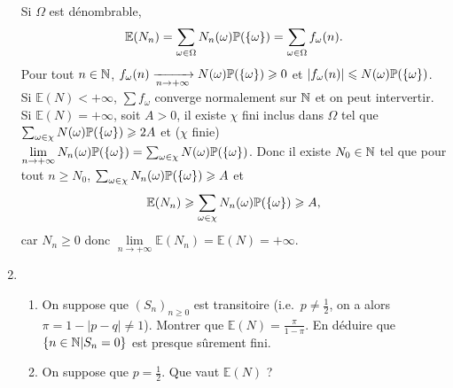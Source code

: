 \documentclass[12pt]{article}
\begin{document}
\begin{exercise}
\begin{enumerate}
        Si $\Omega$ est dénombrable, 
        \begin{equation}
            \mathbb{E}(N_n)=\sum_{\omega\in\Omega}N_n(\omega)\P(\lbrace\omega\rbrace)=\sum_{\omega\in\Omega}f_\omega(n).
        \end{equation}
        Pour tout $n\in\N$, $f_\omega(n)\xrightarrow[n\to+\infty]{}N(\omega)\P(\lbrace\omega\rbrace)\geqslant0$ et $\left\lvert f_\omega(n)\right\rvert\leqslant N(\omega)\P(\lbrace\omega\rbrace)$. Si $\mathbb{E}(N)<+\infty$, $\sum f_\omega$ converge normalement sur $\N$ et on peut intervertir. Si $\mathbb{E}(N)=+\infty$, soit $A>0$, il existe $\chi$ fini inclus dans $\Omega$ tel que $\sum_{\omega\in\chi}N(\omega)\P(\lbrace\omega\rbrace)\geqslant 2A$ et ($\chi$ finie) $\lim\limits_{n\to+\infty}N_n(\omega)\P(\lbrace\omega\rbrace)=\sum_{\omega\in\chi}N(\omega)\P(\lbrace\omega\rbrace)$. Donc il existe $N_0\in\N$ tel que pour tout $n\geqslant N_0$, $\sum_{\omega\in\chi}N_n(\omega)\P(\lbrace\omega\rbrace)\geqslant A$ et 
        \begin{equation}
            \mathbb{E}(N_n)\geqslant\sum_{\omega\in\chi}N_n(\omega)\P(\lbrace\omega\rbrace)\geqslant A,
        \end{equation}
        car $N_n\geqslant0$ donc $\lim\limits_{n\to+\infty}\mathbb{E}(N_n)=\mathbb{E}(N)=+\infty$.

        \item 
        \begin{enumerate}
            \item On suppose que $(S_n)_{n\geqslant 0}$ est transitoire (i.e.~$p\neq\frac{1}{2}$, on a alors $\pi=1-\left\lvert p-q\right\rvert\neq1$). Montrer que $\mathbb{E}(N)=\frac{\pi}{1-\pi}$. En déduire que $\left\lbrace n\in\N\middle| S_n=0\right\rbrace$ est presque sûrement fini.
            \item On suppose que $p=\frac{1}{2}$. Que vaut $\mathbb{E}(N)$ ?
        \end{enumerate}


\end{enumerate}
\end{exercise}
\end{document}
